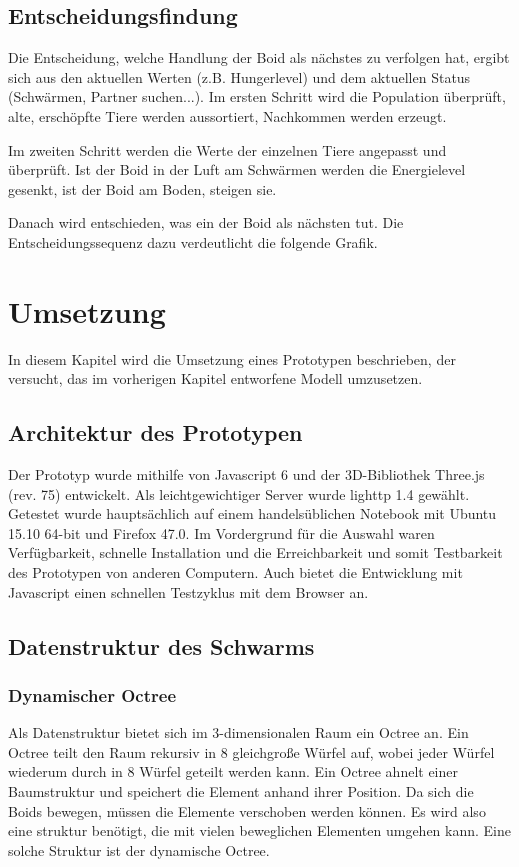 \documentclass[draft=false
              ,paper=a4
              ,twoside=false
              ,fontsize=11pt
              ,headsepline
              ,BCOR10mm
              ,DIV11
              ,bibtotoc
              ,liststotoc
              ]{scrbook}
\begin{document}
\section{Entscheidungsfindung}
Die Entscheidung, welche Handlung der Boid als nächstes zu verfolgen hat, ergibt sich aus den aktuellen Werten (z.B. Hungerlevel) und dem aktuellen Status (Schwärmen, Partner suchen...). Im ersten Schritt wird die Population überprüft, alte, erschöpfte Tiere werden aussortiert, Nachkommen werden erzeugt.

Im zweiten Schritt werden die Werte der einzelnen Tiere angepasst und überprüft. Ist der Boid in der Luft am Schwärmen werden die Energielevel gesenkt, ist der Boid am Boden, steigen sie.

Danach wird entschieden, was ein der Boid als nächsten tut. Die Entscheidungssequenz dazu verdeutlicht die folgende Grafik.

\chapter{Umsetzung}\label{umsetzung}
In diesem Kapitel wird die Umsetzung eines Prototypen beschrieben, der versucht, das im vorherigen Kapitel entworfene Modell umzusetzen.
\section{Architektur des Prototypen}
Der Prototyp wurde mithilfe von Javascript 6 und der 3D-Bibliothek Three.js (rev. 75) entwickelt. Als leichtgewichtiger Server wurde lighttp 1.4 gewählt. Getestet wurde hauptsächlich auf einem handelsüblichen Notebook mit Ubuntu 15.10 64-bit und Firefox 47.0.
Im Vordergrund für die Auswahl waren Verfügbarkeit, schnelle Installation und die Erreichbarkeit und somit Testbarkeit des Prototypen von anderen Computern. Auch bietet die Entwicklung mit Javascript einen schnellen Testzyklus mit dem Browser an. 
\section{Datenstruktur des Schwarms}
\subsection{Dynamischer Octree}
Als Datenstruktur bietet sich im 3-dimensionalen Raum ein Octree an. Ein Octree teilt den Raum rekursiv in 8 gleichgroße Würfel auf, wobei jeder Würfel wiederum durch in 8 Würfel geteilt werden kann. Ein Octree ahnelt einer Baumstruktur und speichert die Element anhand ihrer Position. Da sich die Boids bewegen, müssen die Elemente verschoben werden können. Es wird also eine struktur benötigt, die mit vielen beweglichen Elementen umgehen kann. Eine solche Struktur ist der dynamische Octree.
\end{document}
